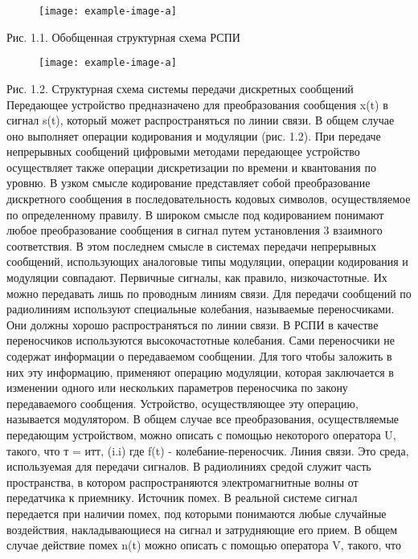 ﻿\documentclass[a4paper,12pt]{article}
\begin{document}
\begin{figure}[H]
	\centering
	\texttt{[image: example-image-a]}
	\caption{}
\end{figure}
Рис. 1.1. Обобщенная структурная схема РСПИ

\begin{figure}[H]
	\centering
	\texttt{[image: example-image-a]}
	\caption{}
\end{figure}
Рис. 1.2. Структурная схема системы передачи дискретных сообщений
Передающее устройство предназначено для преобразования сообщения x(t) в сигнал s(t), который может распространяться по линии связи. В общем случае оно выполняет операции кодирования и модуляции (рис. 1.2). При передаче непрерывных сообщений цифровыми методами передающее устройство осуществляет также операции дискретизации по времени и квантования по уровню. В узком смысле кодирование представляет собой преобразование дискретного сообщения в последовательность кодовых символов, осуществляемое по определенному правилу. В широком смысле под кодированием понимают любое преобразование сообщения в сигнал путем установления
3
взаимного соответствия. В этом последнем смысле в системах передачи непрерывных сообщений, использующих аналоговые типы модуляции, операции кодирования и модуляции совпадают.
Первичные сигналы, как правило, низкочастотные. Их можно передавать лишь по проводным линиям связи. Для передачи сообщений по радиолиниям используют специальные колебания, называемые переносчиками. Они должны хорошо распространяться по линии связи. В РСПИ в качестве переносчиков используются высокочастотные колебания.
Сами переносчики не содержат информации о передаваемом сообщении. Для того чтобы заложить в них эту информацию, применяют операцию модуляции, которая заключается в изменении одного или нескольких параметров переносчика по закону передаваемого сообщения. Устройство, осуществляющее эту операцию, называется модулятором.
В общем случае все преобразования, осуществляемые передающим устройством, можно описать с помощью некоторого оператора U, такого, что
т = итт,	(i.i)
где f(t) - колебание-переносчик.
Линия связи. Это среда, используемая для передачи сигналов. В радиолиниях средой служит часть пространства, в котором распространяются электромагнитные волны от передатчика к приемнику.
Источник помех. В реальной системе сигнал передается при наличии помех, под которыми понимаются любые случайные воздействия, накладывающиеся на сигнал и затрудняющие его прием. В общем случае действие помех n(t) можно описать с помощью оператора V, такого, что
\end{document}
